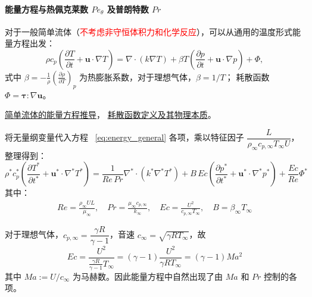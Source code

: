 \paragraph{能量方程与热佩克莱数 $Pe_\theta$ 及普朗特数 $Pr$}
对于一般简单流体（\textcolor{red}{不考虑非守恒体积力和化学反应}），可以从通用的温度形式能量方程出发：
\begin{equation}
    \rho c_p \left( \frac{\partial T}{\partial t} + \mathbf{u}\cdot\nabla T \right) 
    = \nabla \cdot (k \nabla T) + \beta T \left( \frac{\partial p}{\partial t} + \mathbf{u}\cdot\nabla p \right) + \Phi ,
    \label{eq:energy_general}
\end{equation}
式中 $\beta = -\frac{1}{\rho}\left(\frac{\partial \rho}{\partial T}\right)_p$ 为热膨胀系数，对于理想气体，$\beta = 1/T$；
耗散函数 $\Phi = \boldsymbol{\tau} : \nabla \mathbf{u}$。
\begin{note}
    \href{https://github.com/nobodyMa/nobodyMa_note_review_Fluiddynamics/blob/main/%E8%A1%A5%E5%85%85/%E7%AE%80%E5%8D%95%E6%B5%81%E4%BD%93%E7%9A%84%E8%83%BD%E9%87%8F%E6%96%B9%E7%A8%8B.pdf}{简单流体的能量方程推导}，
    \href{https://github.com/nobodyMa/nobodyMa_note_review_Fluiddynamics/blob/main/%E8%A1%A5%E5%85%85/%E8%80%97%E6%95%A3%E5%87%BD%E6%95%B0%E5%AE%9A%E4%B9%89.pdf}{耗散函数定义及其物理本质}。
\end{note}


将无量纲变量代入方程 ~\eqref{eq:energy_general} 各项，乘以特征因子 $\dfrac{L}{\rho_\infty c_{p,\infty} T_\infty U}$，整理得到：
\begin{equation}
    \rho^* c_p^* \left( \frac{\partial T^*}{\partial t^*} + \mathbf{u}^* \cdot \nabla^* T^* \right) 
    = \frac{1}{Re\,Pr} \nabla^* \cdot (k^* \nabla^* T^*)
    + B\,Ec \left( \frac{\partial p^*}{\partial t^*} + \mathbf{u}^* \cdot \nabla^* p^* \right) 
    + \frac{Ec}{Re} \Phi^*
    \label{eq:energy_nondim_general}
\end{equation}
其中：
\begin{align*}
    Re = \frac{\rho_\infty U L}{\mu_\infty}, \quad 
    Pr = \frac{\mu_\infty c_{p,\infty}}{k_\infty}, \quad 
    Ec = \frac{U^2}{c_{p,\infty} T_\infty},\quad
    B = \beta_\infty T_\infty
\end{align*}

对于理想气体，$c_{p,\infty} = \dfrac{\gamma R}{\gamma-1}$，音速 $c_\infty = \sqrt{\gamma R T_\infty}$，故
\begin{equation}
    Ec = \frac{U^2}{\frac{\gamma R}{\gamma-1} T_\infty} = (\gamma-1) \frac{U^2}{\gamma R T_\infty} = (\gamma-1) Ma^2
\end{equation}
其中 $Ma := U/c_\infty$ 为马赫数。因此能量方程中自然出现了由 $Ma$ 和 $Pr$ 控制的各项。

